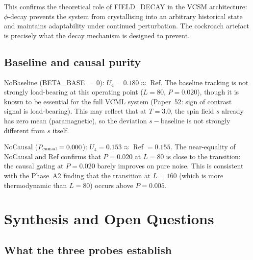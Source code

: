 \documentclass[12pt,a4paper]{article}
\begin{document}
This confirms the theoretical role of FIELD\_DECAY in the VCSM architecture:
$\phi$-decay prevents the system from crystallising into an arbitrary
historical state and maintains adaptability under continued perturbation.
The cockroach artefact is precisely what the decay mechanism is designed to prevent.

\subsection{Baseline and causal purity}

NoBaseline (BETA\_BASE $= 0$): $U_4 = 0.180 \approx$ Ref.
The baseline tracking is not strongly load-bearing at this operating point
($L=80$, $P=0.020$), though it is known to be essential for the full
VCML system (Paper~52: sign of contrast signal is load-bearing).
This may reflect that at $T=3.0$, the spin field $s$ already has zero mean
(paramagnetic), so the deviation $s - \text{baseline}$ is not strongly
different from $s$ itself.

NoCausal ($P_{\rm causal} = 0.000$): $U_4 = 0.153 \approx$ Ref $= 0.155$.
The near-equality of NoCausal and Ref confirms that $P = 0.020$ at $L=80$
is close to the transition: the causal gating at $P=0.020$ barely improves
on pure noise. This is consistent with the Phase~A2 finding that the transition
at $L=160$ (which is more thermodynamic than $L=80$) occurs above $P=0.005$.

\section{Synthesis and Open Questions}

\subsection{What the three probes establish}
\end{document}

